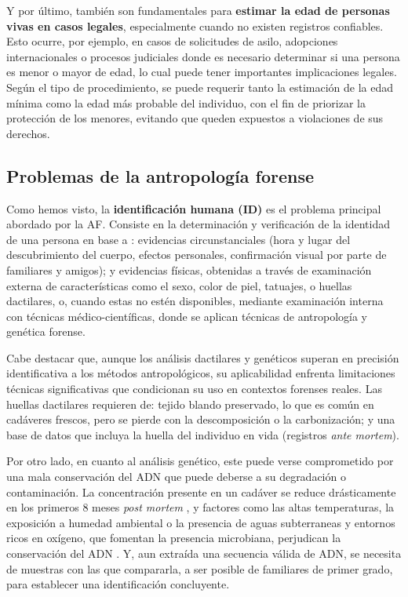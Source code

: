 Y por último, también son fundamentales para \textbf{estimar la edad de personas vivas en casos legales}, 
especialmente cuando no existen registros confiables. Esto ocurre, por ejemplo, en casos de solicitudes 
de asilo, adopciones internacionales o procesos judiciales donde es necesario determinar si una persona 
es menor o mayor de edad, lo cual puede tener importantes implicaciones legales. Según el tipo de 
procedimiento, se puede requerir tanto la estimación de la edad mínima como la edad más probable del 
individuo, con el fin de priorizar la protección de los menores, evitando que queden expuestos a 
violaciones de sus derechos.


\subsection{Problemas de la antropología forense}

Como hemos visto, la \textbf{identificación humana (ID)} es el problema principal abordado por la AF.
Consiste en la determinación y verificación de la identidad de una persona en base a \cite{thompson2006}: 
evidencias circunstanciales (hora y lugar del descubrimiento del cuerpo, efectos personales, confirmación 
visual por parte de familiares y amigos); y evidencias físicas, obtenidas a través de examinación externa
de características como el sexo, color de piel, tatuajes, o huellas dactilares, o, cuando estas no estén
disponibles, mediante examinación interna con técnicas médico-científicas, donde se aplican técnicas de 
antropología y genética forense.

Cabe destacar que, aunque los análisis dactilares y genéticos superan en precisión identificativa a los 
métodos antropológicos, su aplicabilidad enfrenta limitaciones técnicas significativas que condicionan 
su uso en contextos forenses reales.
Las huellas dactilares requieren de: tejido blando preservado, lo que es común en cadáveres frescos, 
pero se pierde con la descomposición o la carbonización; y una base de datos que incluya la huella del 
individuo en vida (registros \textit{ante mortem}).

Por otro lado, en cuanto al análisis genético, este puede verse comprometido por una mala conservación del 
ADN que puede deberse a su degradación o contaminación. La concentración presente en un cadáver se reduce 
drásticamente en los primeros 8 meses \textit{post mortem} \cite{higgins2015}, y factores como las 
altas temperaturas, la exposición a humedad ambiental o la presencia de aguas subterraneas y entornos 
ricos en oxígeno, que fomentan la presencia microbiana, perjudican la conservación del ADN \cite{latham2018}. 
Y, aun extraída una secuencia válida de ADN, se necesita de muestras con las que compararla, a ser posible de 
familiares de primer grado, para establecer una identificación concluyente. 

